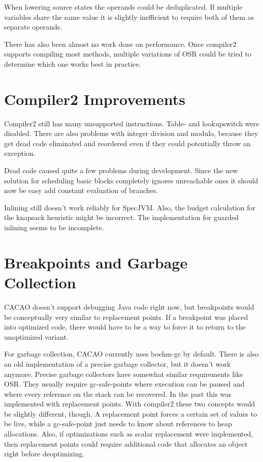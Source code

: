 \documentclass[draft,final]{vutinfth} %
\begin{document}
    When lowering source states the operands could be deduplicated.
    If multiple variables share the same value it is slightly inefficient
    to require both of them as separate operands.

    There has also been almost no work done on performance.
    Once compiler2 supports compiling most methods,
    multiple variations of OSR could be tried to
    determine which one works best in practice.


    \section{Compiler2 Improvements}

    Compiler2 still has many unsupported instructions.
    Table- and lookupswitch were disabled.
    There are also problems with integer division and modulo,
    because they get dead code eliminated and reordered
    even if they could potentially throw an exception.

    Dead code caused quite a few problems during development.
    Since the new solution for scheduling basic blocks completely
    ignores unreachable ones it should now be easy add
    constant evaluation of branches.

    Inlining still doesn't work reliably for SpecJVM.
    Also, the budget calculation for the knapsack heuristic might be incorrect.
    The implementation for guarded inlining seems to be incomplete.


    \section{Breakpoints and Garbage Collection}

    CACAO doesn't support debugging Java code right now,
    but breakpoints would be conceptually very similar to replacement points.
    If a breakpoint was placed into optimized code,
    there would have to be a way to force it to return to the unoptimized variant.

    For garbage collection,
    CACAO currently uses boehm-gc by default.
    There is also an old implementation of a precise garbage collector, but it doesn't work anymore.
    Precise garbage collectors have somewhat similar requirements like OSR.
    They usually require gc-safe-points where execution can be paused
    and where every reference on the stack can be recovered.
    In the past this was implemented with replacement points.
    With compiler2 these two concepts would be slightly different, though.
    A replacement point forces a certain set of values to be live,
    while a gc-safe-point just needs to know about references to heap allocations.
    Also, if optimizations such as scalar replacement were implemented,
    then replacement points could require additional code
    that allocates an object right before deoptimizing.
\end{document}
